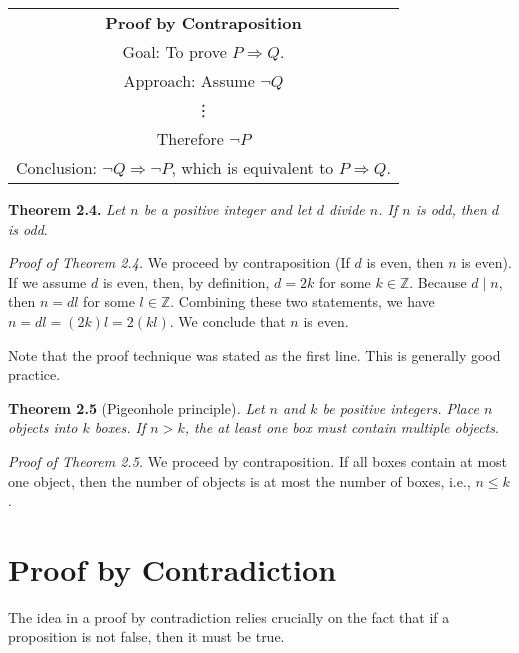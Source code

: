 \documentclass[12pt,a4paper]{article}
\begin{document}
\begin{center}
\begin{tabular}{|c|}
\hline 
\textbf{Proof by Contraposition} \\ 
Goal: To prove $P\Rightarrow Q$. \\ 
Approach: Assume $\neg Q$ \\ 
\vdots \\ 
Therefore $\neg P$ \\ 
Conclusion: $\neg Q\Rightarrow\neg P$, which is equivalent to $P\Rightarrow Q$. \\ 
\hline 
\end{tabular} 
\end{center}

\textbf{Theorem 2.4.} \textit{Let $n$ be a positive integer and let $d$ divide $n$. If $n$ is odd, then $d$ is odd}.

\bigbreak

\textit{Proof of Theorem 2.4.} We proceed by contraposition (If $d$ is even, then $n$ is even). If we assume $d$ is even, then, by definition, $d=2k$ for some $k\in\mathbb{Z}$. Because $d\mid n$, then $n=dl$ for some $l\in\mathbb{Z}$. Combining these two statements, we have $n=dl=(2k)l=2(kl)$. We conclude that $n$ is even.

\bigbreak

Note that the proof technique was stated as the first line. This is generally good practice.

\bigbreak

\textbf{Theorem 2.5} (Pigeonhole principle)\textit{.} \textit{Let $n$ and $k$ be positive integers. Place $n$ objects into $k$ boxes. If $n>k$, the at least one box must contain multiple objects}.

\bigbreak

\textit{Proof of Theorem 2.5.} We proceed by contraposition. If all boxes contain at most one object, then the number of objects is at most the number of boxes, i.e., $n\leq k$.

\section*{Proof by Contradiction}
The idea in a proof by contradiction relies crucially on the fact that if a proposition is not false, then it must be true.
\end{document}
